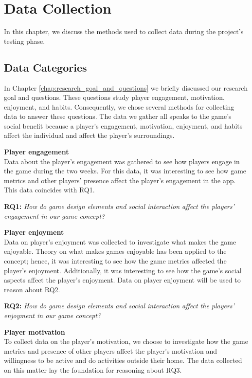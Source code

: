 \section{Data Collection}
\label{chap:data_collection}
In this chapter, we discuss the methods used to collect data during the project’s testing phase.

\subsection{Data Categories}
In Chapter \ref{chap:research_goal_and_questions} we briefly discussed our research goal and questions. These questions study player engagement, motivation, enjoyment, and habits. Consequently, we chose several methods for collecting data to answer these questions. The data we gather all speaks to the game’s social benefit because a player’s engagement, motivation, enjoyment, and habits affect the individual and affect the player’s surroundings.

\textbf{Player engagement}\\
Data about the player’s engagement was gathered to see how players engage in the game during the two weeks. For this data, it was interesting to see how game metrics and other players’ presence affect the player’s engagement in the app. This data coincides with RQ1.

\textbf{RQ1:} \textit{How do game design elements and social interaction affect the players’ engagement in our game concept?}

\textbf{Player enjoyment}\\
Data on player’s enjoyment was collected to investigate what makes the game enjoyable. Theory on what makes games enjoyable has been applied to the concept; hence, it was interesting to see how the game metrics affected the player’s enjoyment. Additionally, it was interesting to see how the game’s social aspects affect the player’s enjoyment. Data on player enjoyment will be used to reason about RQ2.

\textbf{RQ2:} \textit{How do game design elements and social interaction affect the players’ enjoyment in our game concept?}

\textbf{Player motivation}\\
To collect data on the player’s motivation, we choose to investigate how the game metrics and presence of other players affect the player’s motivation and willingness to be active and do activities outside their home. The data collected on this matter lay the foundation for reasoning about RQ3.


